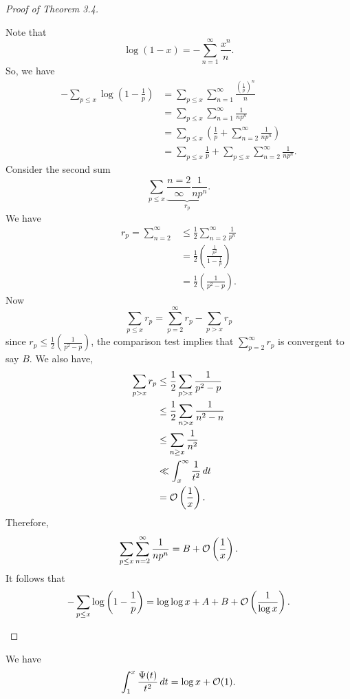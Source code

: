 \documentclass[twoside, openright, fontsize=10pt, headings=big]{scrbook}
\begin{document}
\begin{proof}[Proof of Theorem 3.4]
\begin{enumerate}
\[        \]
        Note that 
        \[
            \log(1-x)=-\sum_{n=1}^{\infty}\frac{x^n}{n}.
        \]
        So, we have
        \begin{align*}
            -\sum_{p\leq x}\log\left(1-\frac{1}{p}\right)&=\sum_{p\leq x}\sum_{n=1}^{\infty}\frac{\left(\frac{1}{p}\right)^n}{n}\\
            &=\sum_{p\leq x}\sum_{n=1}^{\infty}\frac{1}{np^n}\\
            &=\sum_{p\leq x}\left(\frac{1}{p}+\sum_{n=2}^{\infty}\frac{1}{np^n}\right)\\
            &=\sum_{p\leq x}\frac{1}{p}+\sum_{p\leq x}\sum_{n=2}^{\infty}\frac{1}{np^n}.
        \end{align*}
        Consider the second sum
        \[
            \sum_{p\leq x}\underbrace{\frac{n=2}{\infty}\frac{1}{np^n}}_{r_p}.
        \]
        We have
        \begin{align*}
            r_p=\sum_{n=2}^{\infty}&\leq\frac{1}{2}\sum_{n=2}^{\infty}\frac{1}{p^n}\\
            &=\frac{1}{2}\left(\frac{\frac{1}{p^2}}{1-\frac{1}{p}}\right)\\
            &=\frac{1}{2}\left(\frac{1}{p^2-p}\right).
        \end{align*}
        Now 
        \[
            \sum_{p\leq x}r_p=\sum_{p=2}^{\infty}r_p-\sum_{p>x}r_p
        \]
        since $r_p\leq\frac{1}{2}\left(\frac{1}{p^2-p}\right)$, the comparison test implies that $\sum_{p=2}^{\infty}r_p$ is convergent to say $B$. We also have, 
        \begin{align*}
            \sum_{p>x}r_p&\leq\frac{1}{2}\sum_{p>x}\frac{1}{p^2-p}\\
            &\leq\frac{1}{2}\sum_{n>x}\frac{1}{n^2-n}\\
            &\leq\sum_{n\geq x}\frac{1}{n^2}\\
            &\ll\int_{x}^{\infty}\frac{1}{t^2}\,dt\\
            &=\mathcal{O}\left(\frac{1}{x}\right).
        \end{align*}
        Therefore,
        \[
            \sum_{p\leq x}\sum_{n=2}^{\infty}\frac{1}{np^n}=B+\mathcal{O}\left(\frac{1}{x}\right).
        \]
        It follows that
        \[
            -\sum_{p\leq x}\log\left(1-\frac{1}{p}\right)=\log\log x+A+B+\mathcal{O}\left(\frac{1}{\log x}\right).\qedhere
        \]     
    \end{enumerate}
\end{proof}
\begin{corollary}{}{}
    We have
    \[
        \int_{1}^{x}\frac{\Psi(t)}{t^2}\,dt=\log x+\mathcal{O}(1).
    \]    
\end{corollary}
\end{document}
